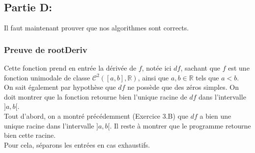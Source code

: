 \documentclass[a4paper, 12pt]{article}
\begin{document}
\subsection{Partie D:}

Il faut maintenant prouver que nos algorithmes sont corrects.

\subsubsection{Preuve de rootDeriv}

Cette fonction prend en entrée la dérivée de \( f \), notée ici \( df \), sachant que \( f \) est une fonction unimodale de classe \( \mathcal{C}^2([a, b], \mathbb{R}) \), ainsi que \( a, b \in \mathbb{R} \) tels que \( a < b \). \\
On sait également par hypothèse que \( df \) ne possède que des zéros simples.
On doit montrer que la fonction retourne bien l'unique racine de \( df \) dans l'intervalle \( ]a, b[ \). \\
Tout d'abord, on a montré précédemment (Exercice 3.B) que \( df \) a bien une unique racine dans l'intervalle \( ]a, b[ \). Il reste à montrer que le programme retourne bien cette racine. \\
Pour cela, séparons les entrées en cas exhaustifs.
\end{document}
